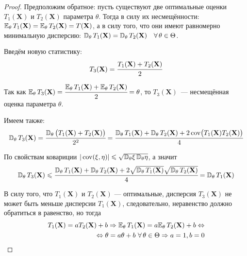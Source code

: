 \begin{proof}
    Предположим обратное: пусть существуют две оптимальные оценки $T_1(\mathbf{X})$ и $T_2(\mathbf{X})$ параметра $\theta$. 
    Тогда в силу их несмещённости: $\mathbb{E}_{\theta}\,  T_{1}(\mathbf{X}) = \mathbb{E}_{\theta}\, T_{2}(\mathbf{X}) = T(\mathbf{X})$,
    а в силу того, что они имеют равномерно минимальную дисперсию: $\mathbb{D}_{\theta}\,  T_{1}(\mathbf{X})=\mathbb{D}_{\theta}\,  T_{2}(\mathbf{X}) \quad \forall \, \theta \in \Theta$.

    Введём новую статистику: 
    \begin{equation*}
        T_{3}(\mathbf{X})=\cfrac{T_{1}(\mathbf{X})+T_{2}(\mathbf{X})}{2}
    \end{equation*}

    Так как $\mathbb{E}_{\theta}\,  T_{3}(\mathbf{X})=\cfrac{\mathbb{E}_{\theta}\,  T_{1}(\mathbf{X})+\mathbb{E}_{\theta}\,  T_{2}(\mathbf{X})}{2}=\theta$, то $T_{3}(\mathbf{X})$~--- несмещённая оценка параметра $\theta$.

    Имеем также:
    \begin{equation*}
        \mathbb{D}_{\theta}\,  T_{3}(\mathbf{X}) = 
        \cfrac{\mathbb{D}_{\theta}\, \bigl(T_{1}(\mathbf{X})+T_{2}(\mathbf{X})\bigr)}{2^2} =
        \cfrac{\mathbb{D}_{\theta}\,  T_{1}(\mathbf{X})+\mathbb{D}_{\theta}\,  T_{2}(\mathbf{X})+2 \operatorname{cov}\bigl(T_{1}(\mathbf{X}) T_{2}(\mathbf{X})\bigr)}{4}
    \end{equation*}

    По свойствам ковариции $| \operatorname{cov}(\xi, \eta)| \leqslant \sqrt{\mathbb{D}_{\theta}\, \!\xi \, \mathbb{D}_{\theta}\, \!\eta}$, а значит
    \begin{equation*}
        \mathbb{D}_{\theta}\,  T_{3}(\mathbf{X}) \leqslant \cfrac{\mathbb{D}_{\theta}\,  T_{1}(\mathbf{X})+\mathbb{D}_{\theta}\,  T_{2}(\mathbf{X})+2 \sqrt{\mathbb{D}_{\theta}\,  T_{1}(\mathbf{X})} \sqrt{\mathbb{D}_{\theta}\,  T_{2}(\mathbf{X})}}{4} =\mathbb{D}_{\theta}\,  T_{1}(\mathbf{X})
    \end{equation*}

    В силу того, что $T_1(\mathbf{X})$ и $T_2(\mathbf{X})$ — оптимальные, дисперсия $T_3(\mathbf{X})$ не может быть меньше дисперсии $T_1(\mathbf{X})$, 
    следовательно, неравенство должно обратиться в равенство, но тогда
    \begin{equation*}
    \begin{aligned}
        T_{1}(\mathbf{X})=a T_{2}(\mathbf{X})+b \Rightarrow \mathbb{E}_{\theta}\,  T_{1}(\mathbf{X})
        = a \mathbb{E}_{\theta}\,  T_{2}(\mathbf{X})+b 
        \Leftrightarrow \\
        \Leftrightarrow \theta = a \theta + b~ \forall \, \theta \in \Theta \Rightarrow a = 1, b = 0
    \end{aligned}
    \end{equation*}
\end{proof}
